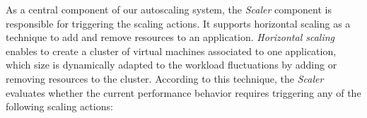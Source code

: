 




As a central component of our autoscaling system, the \emph{Scaler} component is responsible for triggering the scaling actions. It supports horizontal scaling as a technique to add and remove resources to an application. \emph{Horizontal scaling} enables to create a cluster of virtual machines associated to one application, which size is dynamically adapted to the workload fluctuations by adding or removing resources to the cluster. According to this technique, the \emph{Scaler} evaluates whether the current performance behavior requires triggering any of the following scaling actions: 

